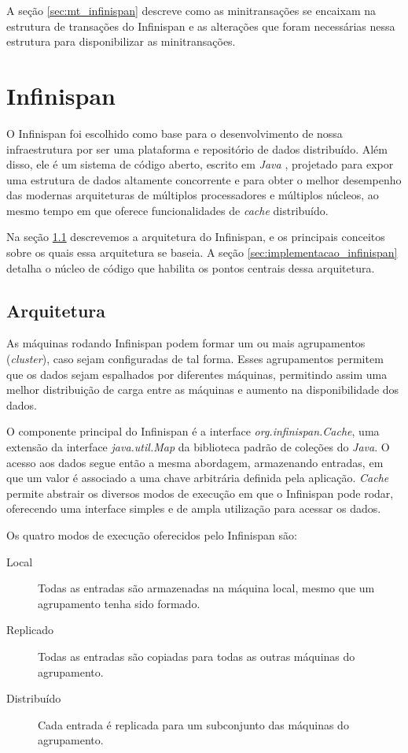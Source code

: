 \documentclass[11pt,twoside,a4paper]{book}
\begin{document}
A seção \ref{sec:mt_infinispan} descreve como as minitransações se encaixam na estrutura de transações do Infinispan e as alterações que foram necessárias nessa estrutura para disponibilizar as minitransações.

\section{Infinispan}
\label{sec:infinispan}
O Infinispan foi escolhido como base para o desenvolvimento de nossa infraestrutura por ser uma plataforma e repositório de dados distribuído. Além disso, ele é um sistema de código aberto, escrito em \emph{Java} \cite{java}, projetado para expor uma estrutura de dados altamente concorrente e para obter o melhor desempenho das modernas arquiteturas de múltiplos processadores e múltiplos núcleos, ao mesmo tempo em que oferece funcionalidades de \emph{cache} distribuído.

Na seção \ref{sec:arquitetura_infinispan} descrevemos a arquitetura do Infinispan, e os principais conceitos sobre os quais essa arquitetura se baseia. A seção \ref{sec:implementacao_infinispan} detalha o núcleo de código que habilita os pontos centrais dessa arquitetura.

\subsection{Arquitetura}
\label{sec:arquitetura_infinispan}
As máquinas rodando Infinispan podem formar um ou mais agrupamentos (\emph{cluster}), caso sejam configuradas de tal forma. Esses agrupamentos permitem que os dados sejam espalhados por diferentes máquinas, permitindo assim uma melhor distribuição de carga entre as máquinas e aumento na disponibilidade dos dados.

O componente principal do Infinispan é a interface \emph{org.infinispan.Cache}, uma extensão da interface \emph{java.util.Map} da biblioteca padrão de coleções do \emph{Java}. O acesso aos dados segue então a mesma abordagem, armazenando entradas, em que um valor é associado a uma chave arbitrária definida pela aplicação. \emph{Cache} permite abstrair os diversos modos de execução em que o Infinispan pode rodar, oferecendo uma interface simples e de ampla utilização para acessar os dados.

Os quatro modos de execução oferecidos pelo Infinispan são:

\begin{description}
	\item[Local] Todas as entradas são armazenadas na máquina local, mesmo que um agrupamento tenha sido formado.
	\item[Replicado] Todas as entradas são copiadas para todas as outras máquinas do agrupamento.
	\item[Distribuído] Cada entrada é replicada para um subconjunto das máquinas do agrupamento.
\end{description}
\end{document}
